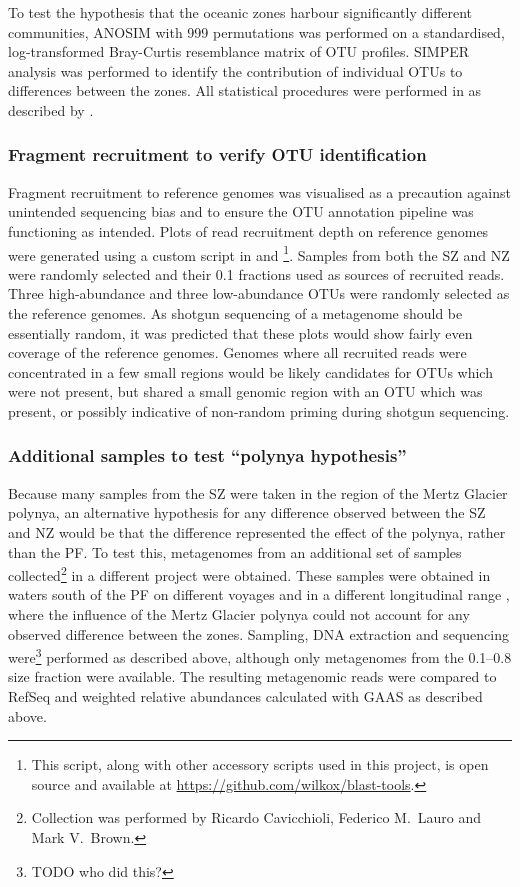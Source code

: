 

To test the hypothesis that the oceanic zones harbour significantly different communities, \ac{ANOSIM} with 999 permutations was performed on a standardised, log-transformed Bray-Curtis resemblance matrix of \ac{OTU} profiles.
\ac{SIMPER} analysis was performed to identify the contribution of individual \acp{OTU} to differences between the zones. 
All statistical procedures were performed in  as described by \citet{Clarke:2001ut}.

\subsubsection{Fragment recruitment to verify \ac{OTU} identification}
Fragment recruitment to reference genomes was visualised as a precaution against unintended sequencing bias and to ensure the \ac{OTU} annotation pipeline was functioning as intended.
Plots of read recruitment depth on reference genomes were generated using a custom script in  and \footnote{This script, along with other accessory scripts used in this project, is open source and available at \url{https://github.com/wilkox/blast-tools}.}.
Samples from both the \ac{SZ} and \ac{NZ} were randomly selected and their 0.1 \micron{} fractions used as sources of recruited reads.
Three high-abundance and three low-abundance \acp{OTU} were randomly selected as the reference genomes.
As shotgun sequencing of a metagenome should be essentially random, it was predicted that these plots would show fairly even coverage of the reference genomes.
Genomes where all recruited reads were concentrated in a few small regions would be likely candidates for \acp{OTU} which were not present, but shared a small genomic region with an \ac{OTU} which was present, or possibly indicative of non-random priming during shotgun sequencing.

\subsubsection{Additional samples to test ``polynya hypothesis''}
Because many samples from the \ac{SZ} were taken in the region of the Mertz Glacier polynya, an alternative hypothesis for any difference observed between the \ac{SZ} and \ac{NZ} would be that the difference represented the effect of the polynya, rather than the \ac{PF}.
To test this, metagenomes from an additional set of samples collected\footnote{Collection was performed by Ricardo Cavicchioli, Federico M.\ Lauro and Mark V.\ Brown.} in a different project were obtained.
These samples were obtained in waters south of the \ac{PF} on different voyages and in a different longitudinal range , where the influence of the Mertz Glacier polynya could not account for any observed difference between the zones.
Sampling, DNA extraction and sequencing were\footnote{TODO who did this?} performed as described above, although only metagenomes from the 0.1--0.8 \micron{} size fraction were available.
The resulting metagenomic reads were compared to RefSeq and weighted relative abundances calculated with \ac{GAAS} as described above.

